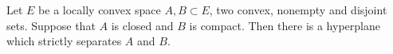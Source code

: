 \documentclass[12pt]{article}
\begin{document}
Let $E$ be a locally convex space $A,B\subset E$, two convex, nonempty and disjoint sets. Suppose that $A$ is closed and $B$ 
is compact. Then there is a hyperplane which strictly separates  $A$ and $B$.
\end{document}
